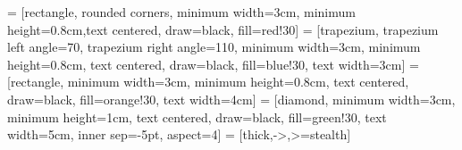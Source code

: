   
{
}

\newcommand{\ifalignrcode}{\hspace{2pt}}
\newcommand{\iftab}{\phantom{x}\hspace{3ex}}
\newcommand{\ifunknown}[1]{\textcolor{blue}{#1}}
\newcommand{\ifaborted}[1]{\textcolor{gray}{#1}}
\newcommand{\ifpassed}[1]{\textcolor{green}{#1}}
\newcommand{\iffailed}[1]{\textcolor{red}{#1}}
\newcommand{\ifnotice}[1]{\textbf{\textcolor{red}{#1}}}
\usepackage{multirow}

\usetikzlibrary{shapes.geometric, arrows}
 = [rectangle, rounded corners, minimum width=3cm, minimum height=0.8cm,text centered, draw=black, fill=red!30]
 = [trapezium, trapezium left angle=70, trapezium right angle=110, minimum width=3cm, minimum height=0.8cm, text centered, draw=black, fill=blue!30, text width=3cm]
 = [rectangle, minimum width=3cm, minimum height=0.8cm, text centered, draw=black, fill=orange!30, text width=4cm]
 = [diamond, minimum width=3cm, minimum height=1cm, text centered, draw=black, fill=green!30, text width=5cm, inner sep=-5pt, aspect=4]
 = [thick,->,>=stealth]